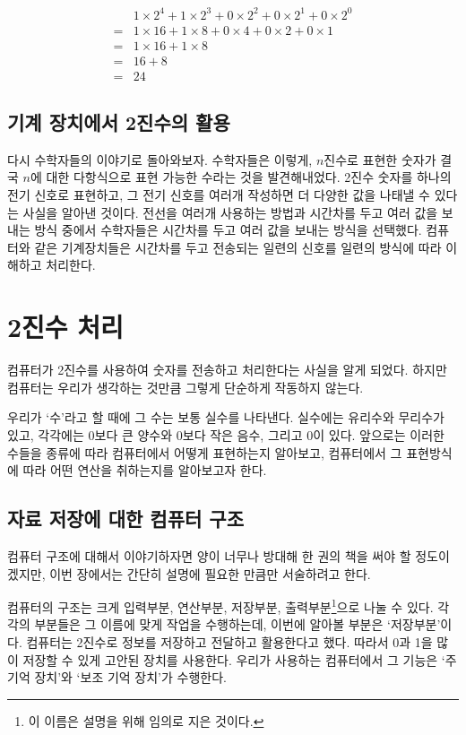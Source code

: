 \documentclass{article}
\begin{document}
$$
\begin{aligned}
     & 1 \times 2^4 + 1 \times 2^3 + 0 \times 2^2 + 0 \times 2^1 + 0 \times 2^0 \\
    =& 1 \times 16 + 1 \times 8 + 0 \times 4 + 0 \times 2 + 0 \times 1 \\
    =& 1 \times 16 + 1 \times 8 \\
    =& 16 + 8 \\
    =& 24
\end{aligned}
$$

\subsection{기계 장치에서 2진수의 활용}

다시 수학자들의 이야기로 돌아와보자. 수학자들은 이렇게, $n$진수로 표현한 숫자가 결국
$n$에 대한 다항식으로 표현 가능한 수라는 것을 발견해내었다. 2진수 숫자를 하나의
전기 신호로 표현하고, 그 전기 신호를 여러개 작성하면 더 다양한 값을 나태낼 수 있다는
사실을 알아낸 것이다. 전선을 여러개 사용하는 방법과 시간차를 두고 여러 값을 보내는
방식 중에서 수학자들은 시간차를 두고 여러 값을 보내는 방식을 선택했다. 컴퓨터와 같은
기계장치들은 시간차를 두고 전송되는 일련의 신호를 일련의 방식에 따라 이해하고 처리한다.

\section{2진수 처리}

컴퓨터가 2진수를 사용하여 숫자를 전송하고 처리한다는 사실을 알게 되었다.
하지만 컴퓨터는 우리가 생각하는 것만큼 그렇게 단순하게 작동하지 않는다.

우리가 `수'라고 할 때에 그 수는 보통 실수를 나타낸다. 실수에는 유리수와 무리수가 있고,
각각에는 0보다 큰 양수와 0보다 작은 음수, 그리고 0이 있다.
앞으로는 이러한 수들을 종류에 따라 컴퓨터에서
어떻게 표현하는지 알아보고, 컴퓨터에서 그 표현방식에 따라 어떤 연산을 취하는지를 알아보고자
한다.

\subsection{자료 저장에 대한 컴퓨터 구조}

컴퓨터 구조에 대해서 이야기하자면 양이 너무나 방대해 한 권의 책을 써야 할 정도이겠지만,
이번 장에서는 간단히 설명에 필요한 만큼만 서술하려고 한다.

컴퓨터의 구조는 크게 입력부분, 연산부분, 저장부분, 출력부분\footnote{이 이름은
설명을 위해 임의로 지은 것이다.}으로 나눌 수 있다.
각각의 부분들은 그 이름에 맞게 작업을 수행하는데, 이번에 알아볼 부분은 `저장부분'이다.
컴퓨터는 2진수로 정보를 저장하고 전달하고 활용한다고 했다. 따라서 0과 1을 많이 저장할 수 있게
고안된 장치를 사용한다. 우리가 사용하는 컴퓨터에서 그 기능은 `주 기억 장치'와 `보조 기억 장치'가
수행한다.
\end{document}

